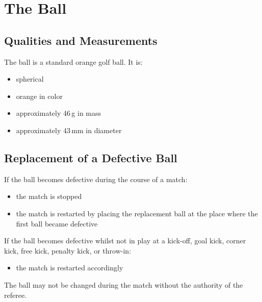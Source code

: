 \section{The Ball}\label{sec:ball}

\subsection{Qualities and Measurements}
The ball is a standard orange golf ball.
It is:
\begin{itemize}
\item spherical
\item orange in color
\item approximately 46\,g in mass
\item approximately 43\,mm in diameter
\end{itemize}

\subsection{Replacement of a Defective Ball}
If the ball becomes defective during the course of a match:
\begin{itemize}
\item the match is stopped
\item the match is restarted by placing the replacement ball at the place where the first ball became defective
\end{itemize}

If the ball becomes defective whilst not in play at a kick-off, goal kick, corner kick, free kick, penalty kick, or throw-in:
\begin{itemize}
\item the match is restarted accordingly
\end{itemize}

The ball may not be changed during the match without the authority of the referee.
